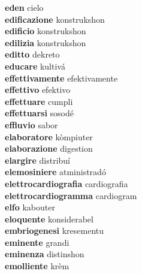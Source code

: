 \textbf{eden } cielo \\
\textbf{edificazione } konstrukshon \\
\textbf{edificio } konstrukshon \\
\textbf{edilizia } konstrukshon \\
\textbf{editto } dekreto \\
\textbf{educare } kultivá \\
\textbf{effettivamente } efektivamente \\
\textbf{effettivo } efektivo \\
\textbf{effettuare } cumpli \\
\textbf{effettuarsi } sosodé \\
\textbf{effluvio } sabor \\
\textbf{elaboratore } kòmpiuter \\
\textbf{elaborazione } digestion \\
\textbf{elargire } distribuí \\
\textbf{elemosiniere } atministradó \\
\textbf{elettrocardiografia } cardiografia \\
\textbf{elettrocardiogramma } cardiogram \\
\textbf{elfo } kabouter \\
\textbf{eloquente } konsiderabel \\
\textbf{embriogenesi } kresementu \\
\textbf{eminente } grandi \\
\textbf{eminenza } distinshon \\
\textbf{emolliente } krèm \\
